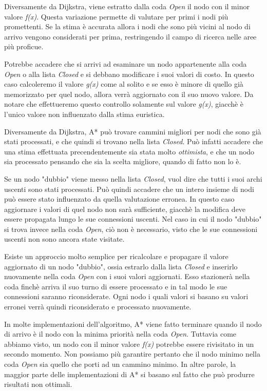 \documentclass[11pt]{article}
\begin{document}
\par{Diversamente da Dijkstra, viene estratto dalla coda \emph{Open} il nodo con il minor valore \emph{f(x)}. Questa variazione permette di valutare per primi i nodi pi\`u promettenti. Se la stima \`e accurata allora i nodi che sono pi\`u vicini al nodo di arrivo vengono considerati per prima, restringendo il campo di ricerca nelle aree pi\`u proficue.}
\par{Potrebbe accadere che si arrivi ad esaminare un nodo appartenente alla coda \emph{Open} o alla lista \emph{Closed} e si debbano modificare i suoi valori di costo. In questo caso calcoleremo il valore \emph{g(x)} come al solito e se esso \`e minore di quello gi\`a memorizzato per quel nodo, allora verr\`a aggiornato con il suo nuovo valore. Da notare che effettueremo questo controllo solamente sul valore \emph{g(x)}, giacch\`e \`e l'unico valore non influenzato dalla stima euristica.}
\par{Diversamente da Dijkstra, A* pu\`o trovare cammini migliori per nodi che sono gi\`a stati processati, e che quindi si trovano nella lista \emph{Closed}. Pu\`o infatti accadere che una stima effettuata precendentemente sia stata molto \emph{ottimista}, e che un nodo sia processato pensando che sia la scelta migliore, quando di fatto non lo \`e.}
\par{
Se un nodo "dubbio" viene messo nella lista \emph{Closed}, vuol dire che tutti i suoi archi uscenti sono stati processati. Pu\`o quindi accadere che un intero insieme di nodi pu\`o essere stato influenzato da quella valutazione erronea. In questo caso aggiornare i valori di quel nodo non sar\`a sufficiente, giacch\`e la modifica deve essere propagata lungo le sue connessioni uscenti. Nel caso in cui il nodo "dubbio" si trova invece nella coda \emph{Open}, ci\`o non \`e necessario, visto che le sue connessioni uscenti non sono ancora state visitate.}
\par{Esiste un approccio molto semplice per ricalcolare e propagare il valore aggiornato di un nodo "dubbio", ossia estrarlo dalla lista \emph{Closed} e inserirlo nuovamente nella coda \emph{Open} con i suoi valori aggiornati. Esso stazioner\`a nella coda finch\`e arriva il suo turno di essere processato e in tal modo le sue connessioni saranno riconsiderate. Ogni nodo i quali valori si basano su valori erronei verr\`a quindi riconsiderato e processato nuovamente.}
\par{In molte implementazioni dell'algoritmo, A* viene fatto terminare quando il nodo di arrivo \`e il nodo con la minima priorit\`a nella coda \emph{Open}. Tuttavia come abbiamo visto, un nodo con il minor valore \emph{f(x)} potrebbe essere rivisitato in un secondo momento. Non possiamo pi\`u garantire pertanto che il nodo minimo nella coda \emph{Open} sia quello che porti ad un cammino minimo. In altre parole, la maggior parte delle implementazioni di A* si basano sul fatto che pu\`o produrre risultati non ottimali.}
\end{document}
